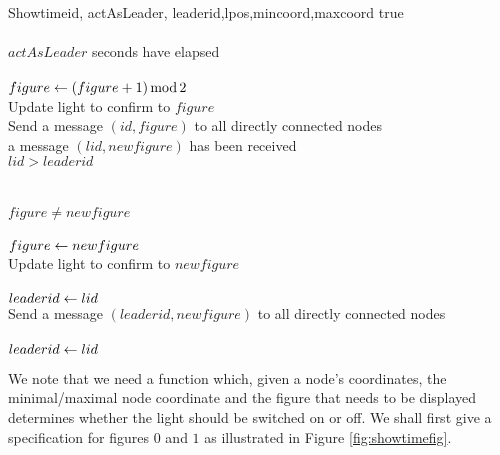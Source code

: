 \begin{myalgo}{Showtime}{id, actAsLeader, leaderid,lpos,mincoord,maxcoord}
 \qwhile true \\
 \qdo {} \\
      \qif $actAsLeader$  seconds have elapsed \\
      \qthen {} \\
	     $figure \mathrel{\leftarrow} (figure +1 ) \operatorname{mod} 2$ \label{sp4:timer1} \\
             Update light to confirm to $figure$ \\
             Send a message $(id,figure)$ to all directly connected nodes \label{sp4:timer2} \qfi \\
      \qif a message $(lid, newfigure)$ has been received \\
      \qthen \qif $lid > leaderid$ \\
             \qthen {} \\
                    \qreset \label{sp4:leadererr} \\
             \qelse \qif $figure \neq newfigure$ \\
                    \qthen {} \\
                           $figure \mathrel{\leftarrow} newfigure$ \label{sp4:sendfollow} \\
                           Update light to confirm to $newfigure$ \\
                            \\
                           $leaderid \mathrel{\leftarrow} lid$ \\
                           Send a message $(leaderid, newfigure)$ to all directly connected nodes \label{sp4:send2}\\
                    \qelse {} \\
                           $leaderid \mathrel{\leftarrow} lid$ \label{sp4:ignupdate} \qfi \qfi \qelihw
\end{myalgo}

We note that we need a function which, given a node's coordinates, the minimal/maximal node coordinate and the figure that needs to be displayed determines whether the light should be switched on or off. We shall first give a specification for figures $0$ and $1$ as illustrated in Figure \ref{fig:showtimefig}.


